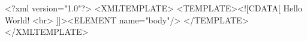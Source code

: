 <?xml version="1.0"?> <XMLTEMPLATE>
    <TEMPLATE><![CDATA[
            Hello World! <br>
        ]]><ELEMENT name="body"/>
    </TEMPLATE>
</XMLTEMPLATE>
